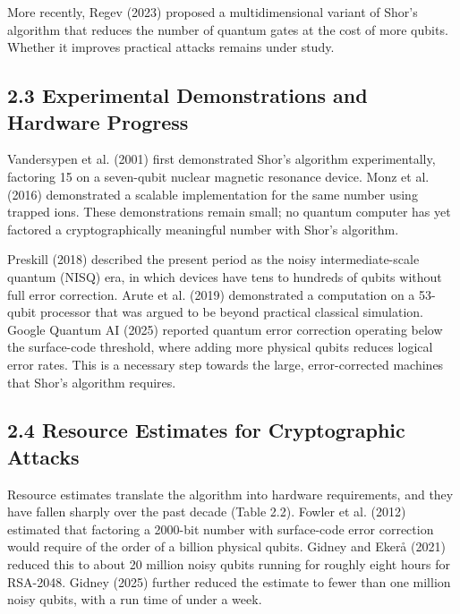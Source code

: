\documentclass[12pt,oneside]{report}
\begin{document}
More recently, Regev (2023) proposed a multidimensional variant of Shor's algorithm that reduces the number of quantum gates at the cost of more qubits. Whether it improves practical attacks remains under study.
\par

\subsection*{2.3 Experimental Demonstrations and Hardware Progress}

Vandersypen et al. (2001) first demonstrated Shor's algorithm experimentally, factoring 15 on a seven-qubit nuclear magnetic resonance device. Monz et al. (2016) demonstrated a scalable implementation for the same number using trapped ions. These demonstrations remain small; no quantum computer has yet factored a cryptographically meaningful number with Shor's algorithm.
\par

Preskill (2018) described the present period as the noisy intermediate-scale quantum (NISQ) era, in which devices have tens to hundreds of qubits without full error correction. Arute et al. (2019) demonstrated a computation on a 53-qubit processor that was argued to be beyond practical classical simulation. Google Quantum AI (2025) reported quantum error correction operating below the surface-code threshold, where adding more physical qubits reduces logical error rates. This is a necessary step towards the large, error-corrected machines that Shor's algorithm requires.
\par

\subsection*{2.4 Resource Estimates for Cryptographic Attacks}

Resource estimates translate the algorithm into hardware requirements, and they have fallen sharply over the past decade (Table 2.2). Fowler et al. (2012) estimated that factoring a 2000-bit number with surface-code error correction would require of the order of a billion physical qubits. Gidney and Ekerå (2021) reduced this to about 20 million noisy qubits running for roughly eight hours for RSA-2048. Gidney (2025) further reduced the estimate to fewer than one million noisy qubits, with a run time of under a week.
\par
\end{document}
